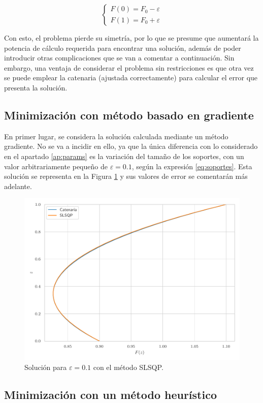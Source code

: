 \begin{equation} \label{eq:soportes}
    \begin{cases}
        F(0) = F_0 - \varepsilon \\
        F(1) = F_0 + \varepsilon
    \end{cases}
\end{equation}

Con esto, el problema pierde su simetría, por lo que se presume que aumentará la potencia de cálculo requerida para encontrar una solución, además de poder introducir otras complicaciones que se van a comentar a continuación. Sin embargo, una ventaja de considerar el problema sin restricciones es que otra vez se puede emplear la catenaria (ajustada correctamente) para calcular el error que presenta la solución.


\subsection{Minimización con método basado en gradiente}

En primer lugar, se considera la solución calculada mediante un método gradiente. No se va a incidir en ello, ya que la única diferencia con lo considerado en el apartado \ref{ap:params} es la variación del tamaño de los soportes, con un valor arbitrariamente pequeño de $\varepsilon = 0.1$, según la expresión \ref{eq:soportes}. Esta solución se representa en la Figura \ref{fig:sol_eps_SLSQP} y sus valores de error se comentarán más adelante.

\begin{figure}[h]
    \centering
    \includegraphics[width = 0.6 \linewidth]{Figures/01/sol_eps_SLSQP.pdf}
    \caption{Solución para $\varepsilon = 0.1$ con el método SLSQP.}
    \label{fig:sol_eps_SLSQP}
\end{figure}


\subsection{Minimización con un método heurístico}

